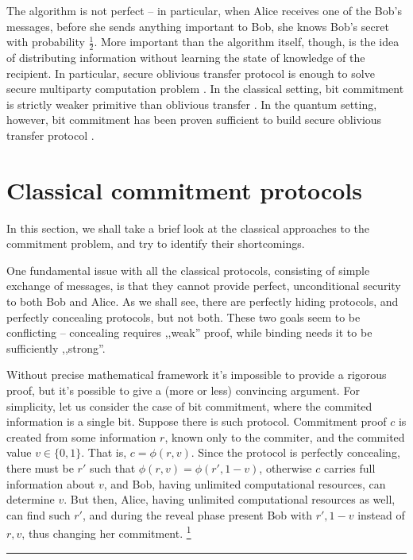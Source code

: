 \documentclass[10pt]{article}
\begin{document}
The algorithm is not perfect -- in particular, when Alice receives one of the Bob's messages, before
she sends anything important to Bob, she knows Bob's secret with probability \(\frac{1}{2}\). More
important than the algorithm itself, though, is the idea of distributing information without learning
the state of knowledge of the recipient. In particular, secure oblivious transfer protocol is enough
to solve secure multiparty computation problem \cite{Kilian88}. In the classical setting, bit commitment
is strictly weaker primitive than oblivious transfer \cite{Brassard88}. In the quantum setting, however,
bit commitment has been proven sufficient to build secure oblivious transfer protocol 
\cite{Bennet92,Yao95,Damgard09}.
\footnotemark



\section{Classical commitment protocols}

In this section, we shall take a brief look at the classical approaches to the commitment problem,
and try to identify their shortcomings. 

One fundamental issue with all the classical protocols, consisting of simple exchange of messages,
is that they cannot provide perfect, unconditional security to both Bob and Alice. As we shall see,
there are perfectly hiding protocols, and perfectly concealing protocols, but not both. These two
goals seem to be conflicting -- concealing requires ,,weak'' proof, while binding needs it to be
sufficiently ,,strong''.

Without precise mathematical framework it's impossible to provide a rigorous proof, but it's possible 
to give a (more or less) convincing argument. For simplicity, let us consider the case of bit 
commitment, where the commited information is a single bit. Suppose there is such protocol. Commitment 
proof \(c\) is created from some information \(r\), known only to the commiter, and the commited value 
\(v\in\{0,1\}\). That is, \(c=\phi(r,v)\). Since the protocol is perfectly concealing, there must
be \(r'\) such that \(\phi(r,v)=\phi(r',1-v)\), otherwise \(c\) carries full information about \(v\),
and Bob, having unlimited computational resources, can determine \(v\). But then, Alice, having 
unlimited computational resources as well, can find such \(r'\), and during the reveal phase present 
Bob with \(r', 1-v\) instead of \(r, v\), thus changing her commitment.
\footnote{This reasoning does not apply to quantum protocols, due to their fundamentally different
nature. The conclusion is still true, unfortunately, but the proof is quite different.}
\end{document}
